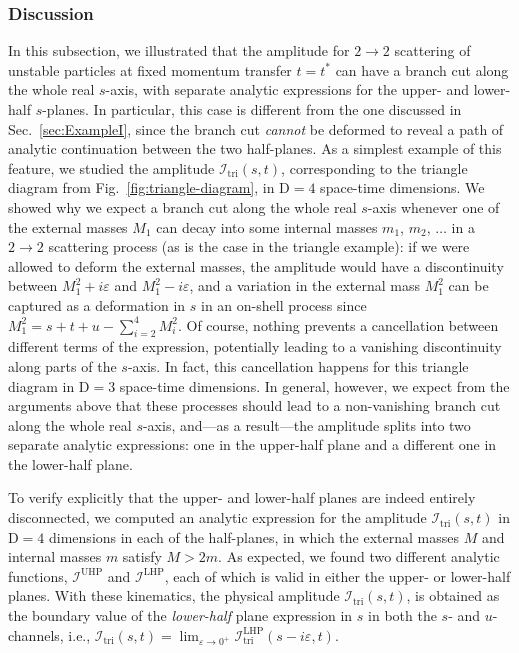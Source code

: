 \documentclass[12pt]{article}
\numberwithin{figure}{section}
\def \D {\mathrm{D}}
\def \eps {\varepsilon}
\def \I {\mathcal{I}}
\def \triangle {\mathrm{tri}}
\def \UHP {\mathrm{UHP}}
\def \LHP {\mathrm{LHP}}
\begin{document}
    \subsubsection{Discussion}
    In this subsection, we illustrated that the amplitude for $2\to2$ scattering of unstable particles at fixed momentum transfer $t=t^\ast$ can have a branch cut along the whole real $s$-axis, with separate analytic expressions for the upper- and lower-half $s$-planes. In particular, this case is different from the one discussed in Sec.~\ref{sec:ExampleI}, since the branch cut \textit{cannot} be deformed to reveal a path of analytic continuation between the two half-planes. As a simplest example of this feature, we studied the amplitude $\I_\triangle (s,t)$, corresponding to the triangle diagram from Fig.~\ref{fig:triangle-diagram}, in $\D=4$ space-time dimensions. We showed why we expect a branch cut along the whole real $s$-axis whenever one of the external masses $M_1$ can decay into some internal masses $m_1$, $m_2$, $\ldots$ in a $2 \to 2$ scattering process (as is the case in the triangle example): if we were allowed to deform the external masses, the amplitude would have a discontinuity between $M_1^2+i\eps$ and $M_1^2-i\eps$, and a variation in the external mass $M_1^2$ can be captured as a deformation in $s$ in an on-shell process since $M_1^2 = s+t+u - \sum_{i=2}^4 M_i^2$. Of course, nothing prevents a cancellation between different terms of the expression, potentially leading to a vanishing discontinuity along parts of the $s$-axis. In fact, this cancellation happens for this triangle diagram in $\D=3$ space-time dimensions. In general, however, we expect from the arguments above that these processes should lead to a non-vanishing branch cut along the whole real $s$-axis, and---as a result---the amplitude splits into two separate analytic expressions: one in the upper-half plane and a different one in the lower-half plane.
    
    To verify explicitly that the upper- and lower-half planes are indeed entirely disconnected, we computed an analytic expression for the amplitude $\I_\triangle (s,t)$ in $\D=4$ dimensions in each of the half-planes, in which the external masses $M$ and internal masses $m$ satisfy $M>2m$. As expected, we found two different analytic functions, $\I^{\UHP}$ and $\I^{\LHP}$, each of which is valid in either the upper- or lower-half planes. With these kinematics, the physical amplitude $\I_\triangle(s,t)$, is obtained as the boundary value of the \textit{lower-half} plane expression in $s$ in both the $s$- and $u$-channels, i.e.,  $\I_\triangle(s,t)=\lim_{\eps\to 0^+}\I^{\LHP}_\triangle(s-i\varepsilon,t)$.
    
\end{document}
